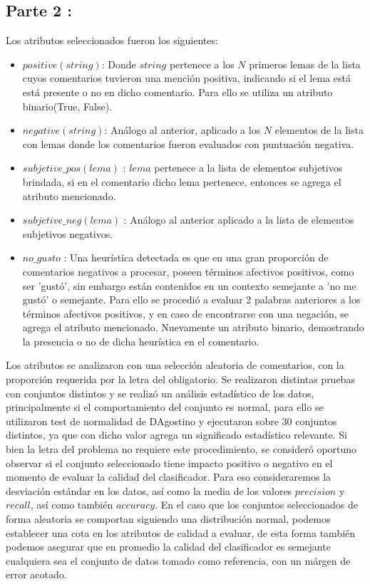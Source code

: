 \documentclass[12pt]{article}
\begin{document}
\subsection{Parte 2 :} \label{sub:part2}
Los atributos seleccionados fueron los siguientes:
\begin{itemize}
  \item $positive(string)$: Donde $string$ pertenece a los $N$ primeros lemas de la lista cuyos comentarios tuvieron una mención positiva, indicando si el lema está está presente o no en dicho comentario. Para ello se utiliza un atributo binario(True, False).
  \item $negative(string)$: Análogo al anterior, aplicado a los $N$ elementos de la lista con lemas donde los comentarios fueron evaluados con puntuación negativa.
  \item $subjetive\_pos(lema)$ : $lema$ pertenece a la lista de elementos subjetivos brindada, si en el comentario dicho lema pertenece, entonces se agrega el atributo mencionado.
  \item $subjetive\_neg(lema)$ : Análogo al anterior aplicado a la lista de elementos subjetivos negativos.
  \item $no\_gusto$ : Una heurística detectada es que en una gran proporción de comentarios negativos a procesar, poseen términos afectivos positivos, como ser 'gustó', sin embargo están contenidos en un contexto semejante a 'no me gustó' o semejante. Para ello se procedió a evaluar 2 palabras anteriores a los términos afectivos positivos, y en caso de encontrarse con una negación, se agrega el atributo mencionado. Nuevamente un atributo binario, demostrando la presencia o no de dicha heurística en el comentario.
\end{itemize}
Los atributos se analizaron con una selección aleatoria de comentarios, con la proporción requerida por la letra del obligatorio. Se realizaron distintas pruebas con conjuntos distintos y se realizó un análisis estadístico de los datos, principalmente si el comportamiento del conjunto es normal, para ello se utilizaron test de normalidad de DAgostino y ejecutaron sobre 30 conjuntos distintos, ya que con dicho valor agrega un significado estadístico relevante. Si bien la letra del problema no requiere este procedimiento, se consideró oportuno observar si el conjunto seleccionado tiene impacto positivo o negativo en el momento de evaluar la calidad del clasificador. Para eso consideraremos la desviación estándar en los datos, así como la media de los valores $precision$ y $recall$, así como también $accuracy$. En el caso que los conjuntos seleccionados de forma aleatoria se comportan siguiendo una distribución normal, podemos establecer una cota en los atributos de calidad a evaluar, de esta forma también podemos asegurar que en promedio la calidad del clasificador es semejante cualquiera sea el conjunto de datos tomado como referencia, con un márgen de error acotado.
\end{document}
